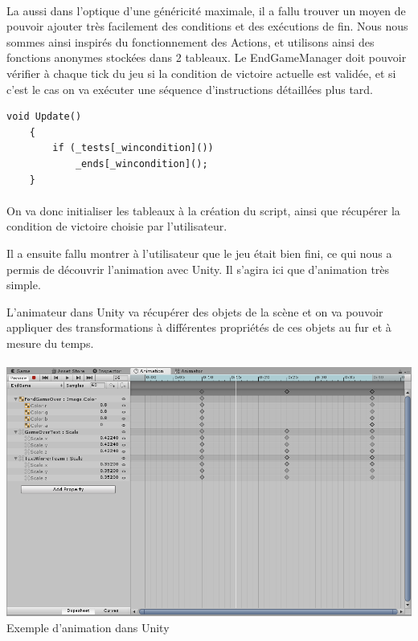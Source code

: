 \documentclass{report}
\begin{document}
\paragraph{}
La aussi dans l’optique d’une généricité maximale, il a fallu trouver un moyen de pouvoir ajouter très facilement des conditions et des exécutions de fin.
Nous nous sommes ainsi inspirés du fonctionnement des Actions, et  utilisons ainsi des fonctions anonymes stockées dans 2 tableaux. 
Le EndGameManager doit pouvoir vérifier à chaque tick du jeu si la condition de victoire actuelle est validée, et si c’est le cas on va exécuter une séquence d’instructions détaillées plus tard.

\begin{lstlisting}[frame=single]
void Update()
    {
        if (_tests[_wincondition]())
            _ends[_wincondition]();
    }
\end{lstlisting}
\paragraph{}

On va donc initialiser les tableaux à la création du script, ainsi que récupérer la condition de victoire choisie par l’utilisateur.

Il  a ensuite fallu montrer à l’utilisateur que le jeu était bien fini, ce qui nous a permis de découvrir l’animation avec Unity. Il s’agira ici que d’animation très simple. 

L’animateur dans Unity va récupérer des objets de la scène et on va pouvoir appliquer des transformations à différentes propriétés de ces objets au fur et à mesure du temps. 

\paragraph{}
\begin{center}
\includegraphics[scale=0.5]{DATA/animation.png}
 {Exemple d’animation dans Unity}
\end{center}
\end{document}
